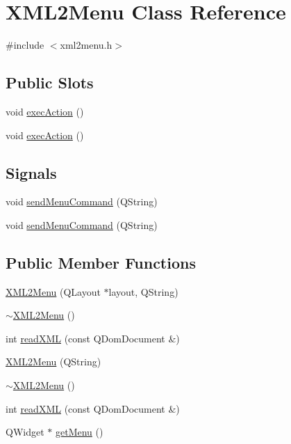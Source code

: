 \hypertarget{classXML2Menu}{
\section{XML2Menu Class Reference}
\label{classXML2Menu}
}


{\ttfamily \#include $<$xml2menu.h$>$}

\subsection*{Public Slots}
\begin{DoxyCompactItemize}
\item 
void \hyperlink{classXML2Menu_a9e6cee2a02fb7f5c009fc659ddcd1974}{execAction} ()
\item 
void \hyperlink{classXML2Menu_a9e6cee2a02fb7f5c009fc659ddcd1974}{execAction} ()
\end{DoxyCompactItemize}
\subsection*{Signals}
\begin{DoxyCompactItemize}
\item 
void \hyperlink{classXML2Menu_a23b75169843ab4c6dc1135189ac3da1d}{sendMenuCommand} (QString)
\item 
void \hyperlink{classXML2Menu_a23b75169843ab4c6dc1135189ac3da1d}{sendMenuCommand} (QString)
\end{DoxyCompactItemize}
\subsection*{Public Member Functions}
\begin{DoxyCompactItemize}
\item 
\hyperlink{classXML2Menu_ab4ac0ccda115176b1034c045d018de76}{XML2Menu} (QLayout $\ast$layout, QString)
\item 
\hyperlink{classXML2Menu_a5aedad854a6e246b0e44b3dd8f3747d6}{$\sim$XML2Menu} ()
\item 
int \hyperlink{classXML2Menu_a9199ad70e7a4e66c75cc2dcf9bdaff1d}{readXML} (const QDomDocument \&)
\item 
\hyperlink{classXML2Menu_ab8ee16ccf25c87c171072a8789ce2b30}{XML2Menu} (QString)
\item 
\hyperlink{classXML2Menu_a5aedad854a6e246b0e44b3dd8f3747d6}{$\sim$XML2Menu} ()
\item 
int \hyperlink{classXML2Menu_a9199ad70e7a4e66c75cc2dcf9bdaff1d}{readXML} (const QDomDocument \&)
\item 
QWidget $\ast$ \hyperlink{classXML2Menu_aaddbb07aff76035cbef70d3dc0741f83}{getMenu} ()
\end{DoxyCompactItemize}

